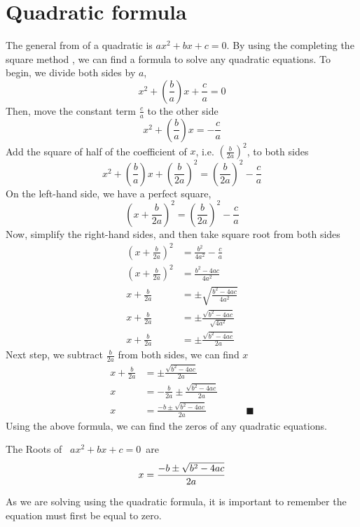 \section{Quadratic formula}
The general from of a quadratic is $ax^2 + bx + c = 0$. By using the completing the square method
, we can find a formula to solve any quadratic equations. To begin, we divide both sides by 
$a$,\[
				x^2+\left(\frac{b}{a}\right)x+\frac{c}{a}=0
\]
Then, move the constant term $\frac{c}{a}$ to the other side
\[
				x^2+\left(\frac{b}{a}\right)x = -\frac{c}{a}
\]
Add the square of half of the coefficient of $x$, i.e. $\left(\frac{b}{2a}\right)^2$, to both
sides
\[
			x^2+\left(\frac{b}{a}\right)x+\left(\frac{b}{2a}\right)^2 = \left(\frac{b}{2a}\right)^2-\frac{c}{a}
\]
On the left-hand side, we have a perfect square,
\[
			\left(x+\frac{b}{2a}\right)^2 = \left(\frac{b}{2a}\right)^2-\frac{c}{a}\]
Now, simplify the right-hand sides, and then take square root from both sides
\begin{align*}
			\left(x+\frac{b}{2a}\right)^2 &= \frac{b^2}{4a^2}-\frac{c}{a} \\
			\left(x+\frac{b}{2a}\right)^2 &= \frac{b^2-4ac}{4a^2} \\
			x+\frac{b}{2a} &=\pm\sqrt{ \frac{b^2-4ac}{4a^2} }\\
			x+\frac{b}{2a} &=\pm\frac{\sqrt{b^2-4ac} }{ \sqrt{4a^2} }\\
			x+\frac{b}{2a} &=\pm{ \frac{\sqrt{b^2-4ac}}{2a}}
\end{align*}
Next step, we subtract $\frac{b}{2a}$ from both sides, we can find $x$
\begin{align*}
			x+\frac{b}{2a} &=\pm{ \frac{\sqrt{b^2-4ac}}{2a}}\\
			x &=-\frac{b}{2a}\pm{ \frac{\sqrt{b^2-4ac}}{2a}}	 \\
			x &=\frac{-b \pm \sqrt{b^2-4ac}}{2a}\qquad \qquad \blacksquare
\end{align*}
Using the above formula, we can find the zeros of any quadratic equations.
\begin{tcolorbox}[
                    title=Quadratic Formula,
                    fonttitle=\bfseries,
                    colframe=blue!50!red,
                    colback=white]
	The Roots of \ $ax^2+bx+c=0$\  are
	\begin{equation}
					x =\frac{-b \pm \sqrt{b^2-4ac}}{2a}	\label{quad} \\
	\end{equation}
\end{tcolorbox}
\begin{nt}
As we are solving using the quadratic formula, it is important to remember the equation must first be equal to zero.	
\end{nt}
